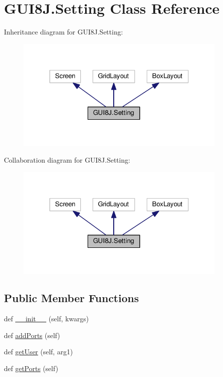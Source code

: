 \hypertarget{classGUI8J_1_1Setting}{}\section{G\+U\+I8\+J.\+Setting Class Reference}
\label{classGUI8J_1_1Setting}


Inheritance diagram for G\+U\+I8\+J.\+Setting\+:
\nopagebreak
\begin{figure}[H]
\begin{center}
\leavevmode
\includegraphics[width=291pt]{classGUI8J_1_1Setting__inherit__graph}
\end{center}
\end{figure}


Collaboration diagram for G\+U\+I8\+J.\+Setting\+:
\nopagebreak
\begin{figure}[H]
\begin{center}
\leavevmode
\includegraphics[width=291pt]{classGUI8J_1_1Setting__coll__graph}
\end{center}
\end{figure}
\subsection*{Public Member Functions}
\begin{DoxyCompactItemize}
\item 
def \hyperlink{classGUI8J_1_1Setting_a118bbfa6da2c767281df5be11f562fff}{\+\_\+\+\_\+init\+\_\+\+\_\+} (self, kwargs)
\item 
def \hyperlink{classGUI8J_1_1Setting_a4f425d03b5c2b8273f01d7e09c3d70bd}{add\+Ports} (self)
\item 
def \hyperlink{classGUI8J_1_1Setting_aa6e419c4232c52e7bbd58276a8cef4d6}{get\+User} (self, arg1)
\item 
def \hyperlink{classGUI8J_1_1Setting_a028d38da60e64282789abd3a806b63d1}{get\+Ports} (self)
\end{DoxyCompactItemize}
